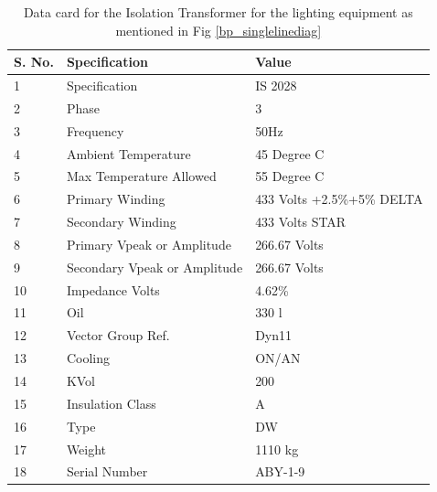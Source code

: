 \documentclass{report}
\begin{document}
	\begin{table}[]
		\centering
		\begin{tabular}{@{}lll@{}}
			\toprule
			\textbf{S. No.} & \textbf{Specification}       & \textbf{Value}             \\ \midrule
			1               & Specification                & IS 2028                    \\
			2               & Phase                        & 3                          \\
			3               & Frequency                    & 50Hz                       \\
			4               & Ambient Temperature          & 45 Degree C                \\
			5               & Max Temperature Allowed      & 55 Degree C                \\
			6               & Primary Winding              & 433 Volts +2.5\%+5\% DELTA \\
			7               & Secondary Winding            & 433 Volts STAR             \\
			8               & Primary Vpeak or Amplitude   & 266.67 Volts               \\
			9               & Secondary Vpeak or Amplitude & 266.67 Volts               \\
			10              & Impedance Volts              & 4.62\%                     \\
			11              & Oil                          & 330 l                      \\
			12              & Vector Group Ref.            & Dyn11                      \\
			13              & Cooling                      & ON/AN                      \\
			14              & KVol                         & 200                        \\
			15              & Insulation Class             & A                          \\
			16              & Type                         & DW                         \\
			17              & Weight                       & 1110 kg                    \\
			18              & Serial Number                & ABY-1-9                    \\ \bottomrule
		\end{tabular}
		\caption{Data card for the Isolation Transformer for the lighting equipment as mentioned in Fig \ref{bp_singlelinediag}}
		\label{sanand_isolation_tf_datacard}
	\end{table}
\end{document}
